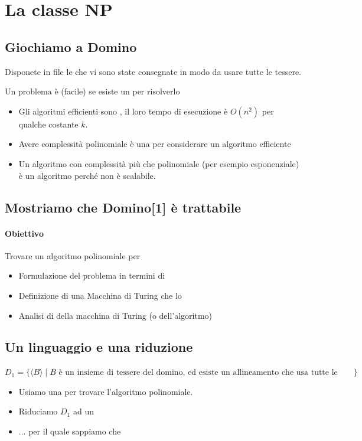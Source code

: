 \section{La classe NP}
\subsection{Giochiamo a Domino}
Disponete in file le  che vi sono state consegnate in modo da 
usare tutte le tessere. 
\begin{definition}
  Un problema è  (facile) se esiste un 
  per risolverlo
\end{definition}
\begin{itemize}
  \item Gli algoritmi efficienti sono , 
    il loro tempo di esecuzione è $O(n^2)$ per qualche costante $k$.
  \item Avere complessità polinomiale è una  per considerare 
    un algoritmo efficiente
  \item Un algoritmo con complessità più che polinomiale (per esempio esponenziale)
    è un algoritmo  perché non è scalabile. 
\end{itemize}
\subsection{Mostriamo che Domino[1] è trattabile}
\paragraph{Obiettivo} Trovare un algoritmo polinomiale per 
\begin{itemize}
  \item Formulazione del problema in termini di 
  \item Definizione di una Macchina di Turing che lo 
  \item Analisi di  della macchina di Turing
    (o dell'algoritmo)
\end{itemize}
\subsection{Un linguaggio e una riduzione}
$D_1=\{\langle B\rangle\mid B\textrm{ 
  è un insieme di tessere del domino, ed esiste un allineamento 
  che usa tutte le tessere
  }\}$
\begin{itemize}
  \item Usiamo una  per trovare l'algoritmo
    polinomiale.
  \item Riduciamo $D_1$ ad un 
  \item ... per il quale sappiamo che 
\end{itemize}
